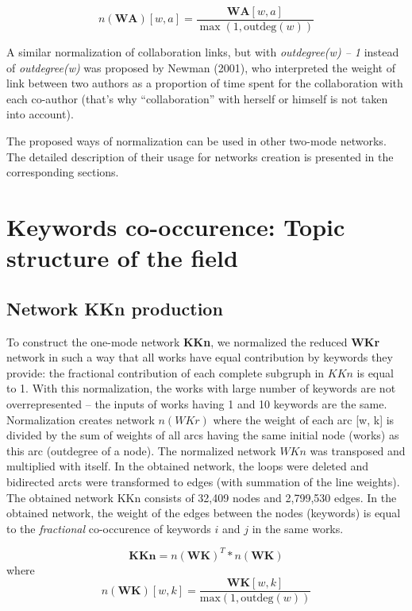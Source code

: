 \documentclass[11pt]{article} %
\begin{document}
\[ n(\mathbf{WA})[w,a] = \frac {\mathbf{WA}[w,a]}{\max(1,\textrm{outdeg}(w))}\] \medskip 

A similar normalization of collaboration links, but with \textit{outdegree(w) -- 1} instead of \textit{outdegree(w)} was proposed by Newman (2001), who interpreted the weight of link between two authors as a proportion of time spent for the collaboration with each co-author (that's why ``collaboration'' with herself or himself is not taken into account). \medskip 

The proposed ways of normalization can be used in other two-mode networks. The detailed description of their usage for networks creation is presented in the corresponding sections. 

\section{Keywords co-occurence: Topic structure of the field}  

\subsection{Network KKn production}

To construct the one-mode network \textbf{KKn}, we normalized the reduced \textbf{WKr} network in such a way that all works have equal contribution by keywords they provide: the fractional contribution of each complete subgruph in $KKn$ is equal to 1. With this normalization, the works with large number of keywords are not overrepresented -- the inputs of works having 1 and 10 keywords are the same. Normalization creates network $n(WKr)$ where the weight of each arc [w, k] is divided by the sum of weights of all arcs having the same initial node (works) as this arc (outdegree of a node). The normalized network $WKn$ was transposed and multiplied with itself. In the obtained network, the loops were deleted and bidirected arcts were transformed to edges (with summation of the line weights). The obtained network KKn consists of 32,409 nodes and 2,799,530 edges. In the obtained network, the weight of the edges between the nodes (keywords) is equal to the \textit{fractional} co-occurence of keywords $i$ and $j$ in the same works.\medskip

\[ \mathbf{KKn} = n(\mathbf{WK})^T * n(\mathbf{WK}) \]
where 
\[ n(\mathbf{WK})[w,k] = \frac {\mathbf{WK}[w,k]}{\textrm{max}(1,\textrm{outdeg}(w))}\]
\medskip
\end{document}
